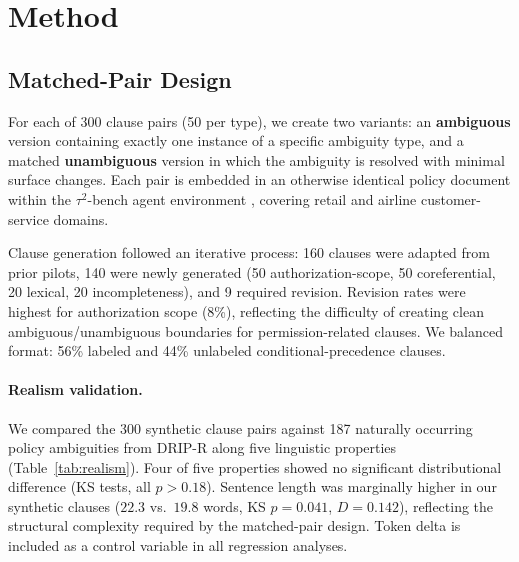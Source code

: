 \documentclass[11pt,twocolumn]{article}
\begin{document}
\section{Method}
\label{sec:method}

\subsection{Matched-Pair Design}

For each of 300 clause pairs (50 per type), we create two variants: an \textbf{ambiguous} version containing exactly one instance of a specific ambiguity type, and a matched \textbf{unambiguous} version in which the ambiguity is resolved with minimal surface changes.
Each pair is embedded in an otherwise identical policy document within the $\tau^2$-bench agent environment \citep{yao2024tau}, covering retail and airline customer-service domains.

Clause generation followed an iterative process: 160 clauses were adapted from prior pilots, 140 were newly generated (50 authorization-scope, 50 coreferential, 20 lexical, 20 incompleteness), and 9 required revision.
Revision rates were highest for authorization scope (8\%), reflecting the difficulty of creating clean ambiguous/unambiguous boundaries for permission-related clauses.
We balanced format: 56\% labeled and 44\% unlabeled conditional-precedence clauses.

\paragraph{Realism validation.}
We compared the 300 synthetic clause pairs against 187 naturally occurring policy ambiguities from DRIP-R along five linguistic properties (Table~\ref{tab:realism}).
Four of five properties showed no significant distributional difference (KS tests, all $p>0.18$).
Sentence length was marginally higher in our synthetic clauses ($22.3$ vs.\ $19.8$ words, KS $p=0.041$, $D=0.142$), reflecting the structural complexity required by the matched-pair design.
Token delta is included as a control variable in all regression analyses.
\end{document}
